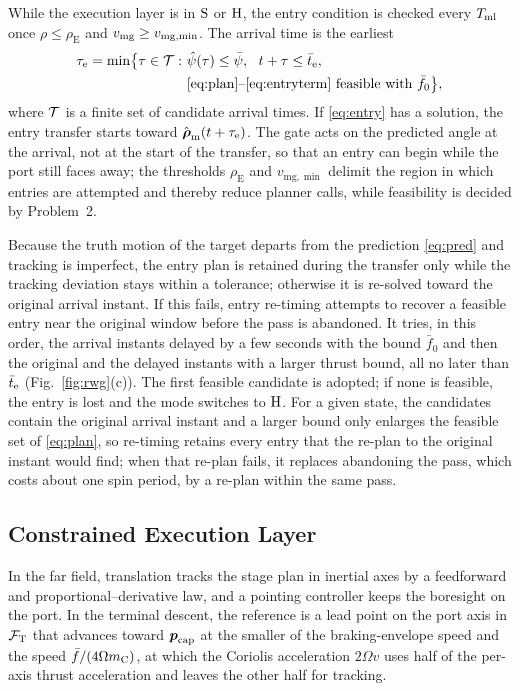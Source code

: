 While the execution layer is in $\mathrm{S}$ or $\mathrm{H}$, the entry condition is checked every $T_{\mathrm{ml}}$ once $\rho\le\rho_{\mathrm{E}}$ and $v_{\mathrm{mg}}\ge v_{\mathrm{mg},\min}$. The arrival time is the earliest
\begin{equation}\label{eq:entry}
\begin{aligned}
\tau_{\mathrm{e}}=\min\bigl\{\tau\in\Tset:\ &\hat\psi(\tau)\le\psig,\ \ t+\tau\le\te,\\
&\text{\eqref{eq:plan}--\eqref{eq:entryterm} feasible with }\bar f_{0}\bigr\},
\end{aligned}
\end{equation}
where $\mathcal{T}$ is a finite set of candidate arrival times. If \eqref{eq:entry} has a solution, the entry transfer starts toward $\hat{\boldsymbol{\rho}}_{\mathrm{m}}(t+\tau_{\mathrm{e}})$. The gate acts on the predicted angle at the arrival, not at the start of the transfer, so that an entry can begin while the port still faces away; the thresholds $\rho_{\mathrm{E}}$ and $v_{\mathrm{mg},\min}$ delimit the region in which entries are attempted and thereby reduce planner calls, while feasibility is decided by Problem~2.

Because the truth motion of the target departs from the prediction \eqref{eq:pred} and tracking is imperfect, the entry plan is retained during the transfer only while the tracking deviation stays within a tolerance; otherwise it is re-solved toward the original arrival instant. If this fails, entry re-timing attempts to recover a feasible entry near the original window before the pass is abandoned. It tries, in this order, the arrival instants delayed by a few seconds with the bound $\bar f_{0}$ and then the original and the delayed instants with a larger thrust bound, all no later than $\bar t_{\mathrm{e}}$ (Fig.~\ref{fig:rwg}(c)). The first feasible candidate is adopted; if none is feasible, the entry is lost and the mode switches to $\mathrm{H}$. For a given state, the candidates contain the original arrival instant and a larger bound only enlarges the feasible set of \eqref{eq:plan}, so re-timing retains every entry that the re-plan to the original instant would find; when that re-plan fails, it replaces abandoning the pass, which costs about one spin period, by a re-plan within the same pass.

\subsection{Constrained Execution Layer}\label{sec:executor}

In the far field, translation tracks the stage plan in inertial axes by a feedforward and proportional--derivative law, and a pointing controller keeps the boresight on the port. In the terminal descent, the reference is a lead point on the port axis in $\mathcal{F}_{\mathrm{T}}$ that advances toward $\boldsymbol{p}_{\mathrm{cap}}$ at the smaller of the braking-envelope speed and the speed $\bar f/(4\Omega m_{\mathrm{C}})$, at which the Coriolis acceleration $2\Omega v$ uses half of the per-axis thrust acceleration and leaves the other half for tracking.


